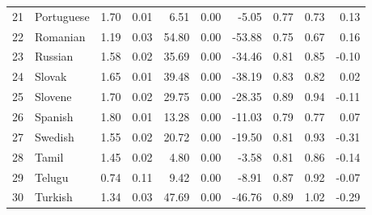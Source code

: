 \documentclass[a4paper]{article}
\begin{document}
\begin{table}[hbtp]
\begin{tabular}{rlrrrrrrrr}
  21 & Portuguese & 1.70 & 0.01 & 6.51 & 0.00 & -5.05 & 0.77 & 0.73 & 0.13 \\ 
  22 & Romanian & 1.19 & 0.03 & 54.80 & 0.00 & -53.88 & 0.75 & 0.67 & 0.16 \\ 
  23 & Russian & 1.58 & 0.02 & 35.69 & 0.00 & -34.46 & 0.81 & 0.85 & -0.10 \\ 
  24 & Slovak & 1.65 & 0.01 & 39.48 & 0.00 & -38.19 & 0.83 & 0.82 & 0.02 \\ 
  25 & Slovene & 1.70 & 0.02 & 29.75 & 0.00 & -28.35 & 0.89 & 0.94 & -0.11 \\ 
  26 & Spanish & 1.80 & 0.01 & 13.28 & 0.00 & -11.03 & 0.79 & 0.77 & 0.07 \\ 
  27 & Swedish & 1.55 & 0.02 & 20.72 & 0.00 & -19.50 & 0.81 & 0.93 & -0.31 \\ 
  28 & Tamil & 1.45 & 0.02 & 4.80 & 0.00 & -3.58 & 0.81 & 0.86 & -0.14 \\ 
  29 & Telugu & 0.74 & 0.11 & 9.42 & 0.00 & -8.91 & 0.87 & 0.92 & -0.07 \\ 
  30 & Turkish & 1.34 & 0.03 & 47.69 & 0.00 & -46.76 & 0.89 & 1.02 & -0.29 \\ 
   \hline
\end{tabular}
\end{table}
\end{document}
